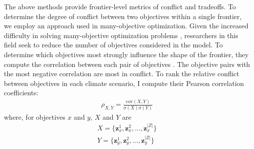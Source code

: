 The above methods provide frontier-level metrics of conflict and tradeoffs. To determine the degree of conflict between two objectives within a single frontier, we employ an approach used in many-objective optimization. Given the increased difficulty in solving many-objective optimization problems \cite{khare2003performance}, researchers in this field seek to reduce the number of objectives considered in the model. To determine which objectives most strongly influence the shape of the frontier, they compute the correlation between each pair of objectives \cite{deb2005finding}. The objective pairs with the most negative correlation are most in conflict. To rank the relative conflict between objectives in each climate scenario, I compute their Pearson correlation coefficients:
\begin{align}
\rho_{X,Y} = \frac{\text{cov}(X,Y)}{\sigma(X)\sigma(Y)}
\end{align}
where, for objectives $x$ and $y$, $X$ and $Y$ are
\begin{align}
X = \{ \mathbf{z}_x^1, \mathbf{z}_x^2, \ldots, \mathbf{z}_x^{|Z|} \} \\
Y = \{ \mathbf{z}_y^1, \mathbf{z}_y^2, \ldots, \mathbf{z}_y^{|Z|} \}
\end{align}